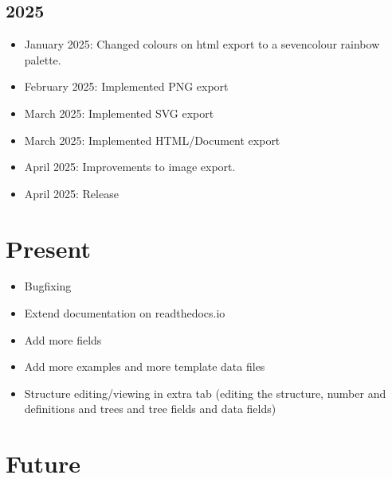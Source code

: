 \documentclass[letterpaper,10pt,english]{sphinxmanual}
\begin{document}
\subsection{2025}
\label{\detokenize{releases:id11}}\begin{itemize}
\item {} 
\sphinxAtStartPar
January 2025: Changed colours on html export to a seven\sphinxhyphen{}colour rainbow palette.

\item {} 
\sphinxAtStartPar
February 2025: Implemented PNG export

\item {} 
\sphinxAtStartPar
March 2025: Implemented SVG export

\item {} 
\sphinxAtStartPar
March 2025: Implemented HTML/Document export

\item {} 
\sphinxAtStartPar
April 2025: Improvements to image export.

\item {} 
\sphinxAtStartPar
April 2025: Release 

\end{itemize}


\section{Present}
\label{\detokenize{releases:present}}\begin{itemize}
\item {} 
\sphinxAtStartPar
Bugfixing

\item {} 
\sphinxAtStartPar
Extend documentation on readthedocs.io

\item {} 
\sphinxAtStartPar
Add more fields

\item {} 
\sphinxAtStartPar
Add more examples and more template data files

\item {} 
\sphinxAtStartPar
Structure editing/viewing in extra tab (editing the structure, number and definitions and trees and tree fields and data fields)

\end{itemize}


\section{Future}
\label{\detokenize{releases:future}}
\end{document}
